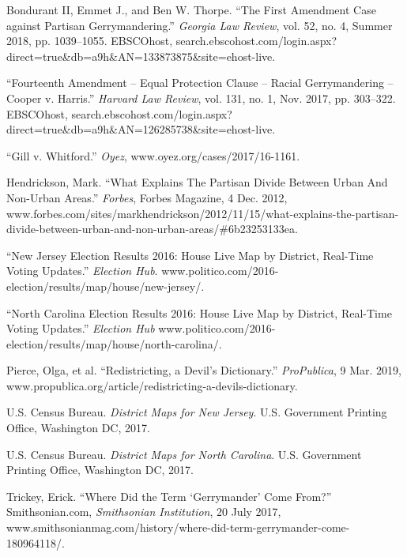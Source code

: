 \documentclass[12pt]{article}
\begin{document}
		\pagebreak
		\begin{thebibliography}{10}
			Bondurant II, Emmet J., and Ben W. Thorpe. “The First Amendment Case against Partisan Gerrymandering.” \textit{Georgia Law Review}, vol. 52, no. 4, Summer 2018, pp. 1039–1055. EBSCOhost, search.ebscohost.com/login.aspx?direct=true\&db=a9h\&AN=133873875\&site=ehost-live.
			
			“Fourteenth Amendment -- Equal Protection Clause -- Racial Gerrymandering -- Cooper v. Harris.” \textit{Harvard Law Review}, vol. 131, no. 1, Nov. 2017, pp. 303–322. EBSCOhost, search.ebscohost.com/login.aspx?direct=true\&db=a9h\&AN=126285738\&site=ehost-live.
			
			“Gill v. Whitford.” \textit{Oyez}, www.oyez.org/cases/2017/16-1161.
			
			Hendrickson, Mark. “What Explains The Partisan Divide Between Urban And Non-Urban Areas.” \textit{Forbes}, Forbes Magazine, 4 Dec. 2012, www.forbes.com/sites/markhendrickson/2012/11/15/what-explains-the-partisan-divide-between-urban-and-non-urban-areas/\#6b23253133ea.
			
			“New Jersey Election Results 2016: House Live Map by District, Real-Time Voting Updates.” \textit{Election Hub}. www.politico.com/2016-election/results/map/house/new-jersey/.
			
			“North Carolina Election Results 2016: House Live Map by District, Real-Time Voting Updates.” \textit{Election Hub} www.politico.com/2016-election/results/map/house/north-carolina/.
			
			Pierce, Olga, et al. “Redistricting, a Devil's Dictionary.” \textit{ProPublica}, 9 Mar. 2019, www.propublica.org/article/redistricting-a-devils-dictionary.
			
			U.S. Census Bureau. \textit{District Maps for New Jersey}.  U.S. Government Printing Office, Washington DC, 2017.
			
			U.S. Census Bureau. \textit{District Maps for North Carolina}.  U.S. Government Printing Office, Washington DC, 2017.
			
			
			
			Trickey, Erick. “Where Did the Term ‘Gerrymander’ Come From?” Smithsonian.com, \textit{Smithsonian Institution}, 20 July 2017, www.smithsonianmag.com/history/where-did-term-gerrymander-come-180964118/.
		
		\end{thebibliography}
		
\end{document}
